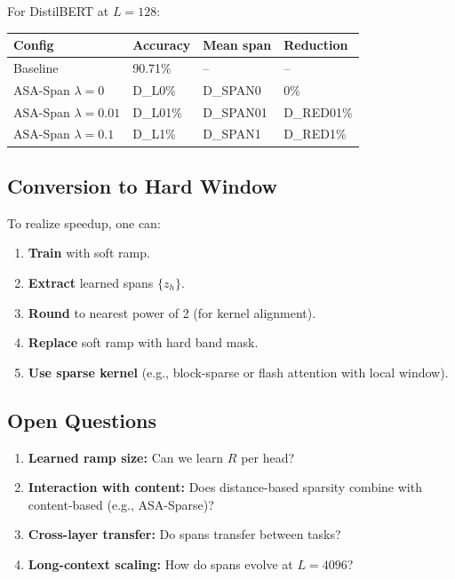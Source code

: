 For DistilBERT at $L = 128$:

\begin{table}[H]
\centering
\small
\begin{tabular}{llll}
\toprule
\textbf{Config} & \textbf{Accuracy} & \textbf{Mean span} & \textbf{Reduction} \\
\midrule
Baseline & 90.71\% & -- & -- \\
ASA-Span $\lambda=0$ & {{D\_L0}}\% & {{D\_SPAN0}} & 0\% \\
ASA-Span $\lambda=0.01$ & {{D\_L01}}\% & {{D\_SPAN01}} & {{D\_RED01}}\% \\
ASA-Span $\lambda=0.1$ & {{D\_L1}}\% & {{D\_SPAN1}} & {{D\_RED1}}\% \\
\bottomrule
\end{tabular}
\end{table}

\subsection{Conversion to Hard Window}

To realize speedup, one can:

\begin{enumerate}
\item \textbf{Train} with soft ramp.
\item \textbf{Extract} learned spans $\{z_h\}$.
\item \textbf{Round} to nearest power of 2 (for kernel alignment).
\item \textbf{Replace} soft ramp with hard band mask.
\item \textbf{Use sparse kernel} (e.g., block-sparse or flash attention with local window).

\end{enumerate}
\subsection{Open Questions}

\begin{enumerate}
\item \textbf{Learned ramp size:} Can we learn $R$ per head?
\item \textbf{Interaction with content:} Does distance-based sparsity combine with
  content-based (e.g., ASA-Sparse)?
\item \textbf{Cross-layer transfer:} Do spans transfer between tasks?
\item \textbf{Long-context scaling:} How do spans evolve at $L = 4096$?

\end{enumerate}
